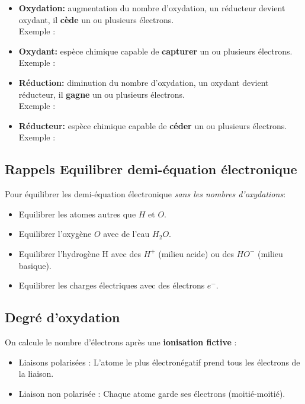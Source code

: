 \documentclass{article}
\begin{document}
\begin{itemize}[label=$\ast$]
    \item \textbf{Oxydation:} augmentation du nombre d'oxydation, un réducteur devient oxydant, il \textbf{cède} un ou plusieurs électrons.\\
          Exemple : 
    \item \textbf{Oxydant:} espèce chimique capable de \textbf{capturer} un ou plusieurs électrons.\\
          Exemple : 
    \item \textbf{Réduction:} diminution du nombre d'oxydation, un oxydant devient réducteur, il \textbf{gagne} un ou plusieurs électrons.\\
          Exemple : 
    \item \textbf{Réducteur:} espèce chimique capable de \textbf{céder} un ou plusieurs électrons.\\ 
          Exemple : 
\end{itemize}

\subsection{Rappels Equilibrer demi-équation électronique}

Pour équilibrer les demi-équation électronique \textit{sans les nombres d'oxydations}:
\begin{itemize}[label=$\ast$]
    \item Equilibrer les atomes autres que $H$ et $O$.
    \item Equilibrer l'oxygène $O$ avec de l'eau $H_2O$.
    \item Equilibrer l'hydrogène H avec des $H^+$ (milieu acide) ou des $HO^-$ (milieu basique).
    \item Equilibrer les charges électriques avec des électrons $e^-$.
\end{itemize}

\subsection{Degré d'oxydation}\label{subsec:degre-d'oxydation}

On calcule le nombre d'électrons après une \textbf{ionisation fictive} :
\begin{itemize}[label=$\ast$]
    \item Liaisons polarisées : L'atome le plus électronégatif prend tous les électrons de la liaison.
    \item Liaison non polarisée : Chaque atome garde ses électrons (moitié-moitié).
\end{itemize}
\end{document}
